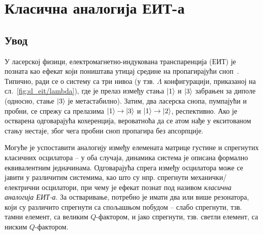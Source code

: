 \documentclass[main.tex]{subfiles}
\begin{document}
\chapter{Класична аналогија ЕИТ-а}%
\label{cha:klasik_eit}

\section{Увод}%
\label{sec:uvod}

У ласерској физици, електромагнетно-индукована транспаренција (ЕИТ) је позната као ефекат који поништава утицај средине на пропагирајући сноп~\cite{harris1990nonlinear}. Типично, ради се о систему са три нивоа (у тзв. $\Lambda$ конфигурацији, приказаној на сл.~\ref{fig:sl_eit/lambda}), где је прелаз између стања $\ket{1}$ и $\ket{3}$ забрањен за диполе (односно, стање $\ket{3}$ је метастабилно). Затим, два ласерска снопа, пумпајући и пробни, се спрежу са прелазима $\ket{1}\to\ket{3}$ и $\ket{1}\to\ket{2}$, респективно. Ако је остварена одговарајућа кохеренција, вероватноћа да се атом нађе у екситованом стању нестаје, због чега пробни сноп пропагира без апсорпције.

Могуће је успоставити аналогију између елемената матрице густине и спрегнутих класичних осцилатора – у оба случаја, динамика система је описана формално еквивалентним једначинама. Одговарајућа спрега између осцилатора може се јавити у различитим системима, као што су нпр. спрегнути механички/електрични осцилатори, при чему је ефекат познат под називом \emph{класична аналогија ЕИТ-а}. За остваривање, потребно је имати два или више резонатора, који су различито спрегнути са спољашњом побудом – слабо спрегнути, тзв. тамни елемент, са великим $Q$-фактором, и јако спрегнути, тзв. светли елемент, са ниским $Q$-фактором.
\end{document}
